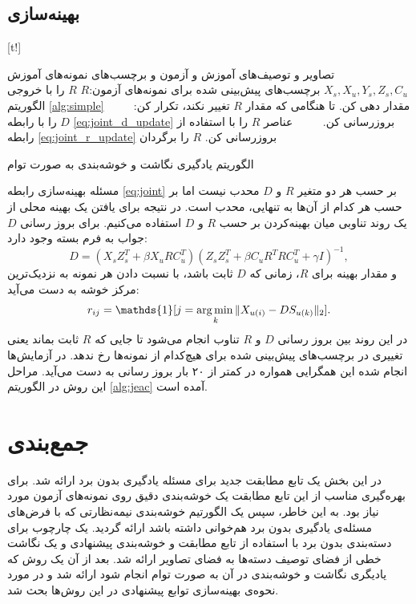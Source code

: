 \subsection{بهینه‌سازی}

[t!]
	\begin{enumerate}[label={\arabic*},itemsep=.1em, parsep=.1em]
 تصاویر و توصیف‌های آموزش و آزمون و برچسب‌های نمونه‌های آموزش $X_s, X_u, Y_s, Z_s, C_u$
 برچسب‌های پیش‌بینی شده برای نمونه‌های آزمون:$R$
 $R$ را با خروجی الگوریتم \ref{alg:simple} مقدار دهی کن.
 تا هنگامی که مقدار $R$ تغییر نکند،  تکرار کن:
 $\qquad$  $D$ را با رابطه \eqref{eq:joint_d_update} بروزرسانی کن.
 $\qquad$ عناصر $R$ را با استفاده از رابطه \eqref{eq:joint_r_update} بروزرسانی کن.
 $R$ را برگردان
\end{enumerate}
\caption{الگوریتم یادگیری نگاشت و خوشه‌بندی به صورت توام}
\label{alg:jeac}

مسئله بهینه‌سازی رابطه \eqref{eq:joint} بر حسب هر دو متغیر $R$ و $D$ محدب  نیست اما بر حسب هر کدام از آن‌ها به تنهایی، محدب است. در نتیجه برای یافتن یک بهینه محلی از یک روند تناوبی میان بهینه‌کردن بر حسب $R$ و $D$ استفاده می‌کنیم.
برای بروز رسانی $D$ جواب به فرم بسته وجود دارد:
\begin{equation} \label{eq:joint_d_update}
  D = (X_s Z_s^T + \beta X_u R C_u^T) (Z_s Z_s^T + \beta C_u R^T R C_u^T  + \gamma I)^{-1},
\end{equation}
و مقدار بهینه برای $R$، زمانی که $D$ ثابت باشد، با نسبت دادن هر نمونه به نزدیک‌ترین مرکز خوشه به دست می‌آید:
\begin{equation} \label{eq:joint_r_update}
  r_{ij} = \mathds{1}[j = \argmin_{k} \lVert X_{u(i)} - D S_{u(k)} \rVert_2 ].
\end{equation}
در این روند بین بروز رسانی $D$ و $R$ تناوب انجام می‌شود تا جایی که $R$ ثابت بماند یعنی تغییری در برچسب‌های پیش‌بینی شده برای هیچ‌کدام از نمونه‌ها رخ ندهد. در آزمایش‌ها انجام شده این همگرایی همواره در کمتر از ۲۰ بار بروز رسانی به دست می‌آید.
مراحل این روش در الگوریتم \ref{alg:jeac} آمده است.
\section{جمع‌بندی}
در این بخش یک تابع مطابقت جدید برای مسئله یادگیری بدون برد ارائه شد. برای بهره‌گیری مناسب از این تابع مطابقت یک خوشه‌بندی دقیق روی نمونه‌های آزمون مورد نیاز بود. به این خاطر، سپس یک الگورتیم خوشه‌بندی نیمه‌نظارتی که با فرض‌های مسئله‌ی یادگیری بدون برد هم‌خوانی داشته باشد ارائه گردید. یک چارچوب برای دسته‌بندی بدون برد با استفاده از تابع مطابقت و خوشه‌بندی پیشنهادی و یک نگاشت خطی از فضای توصیف دسته‌ها به فضای تصاویر ارائه شد. بعد از آن یک روش که یادیگری نگاشت و خوشه‌بندی در آن  به صورت توام انجام شود ارائه شد و در مورد نحوه‌ی بهینه‌سازی توابع پیشنهادی در این روش‌ها بحث شد.

